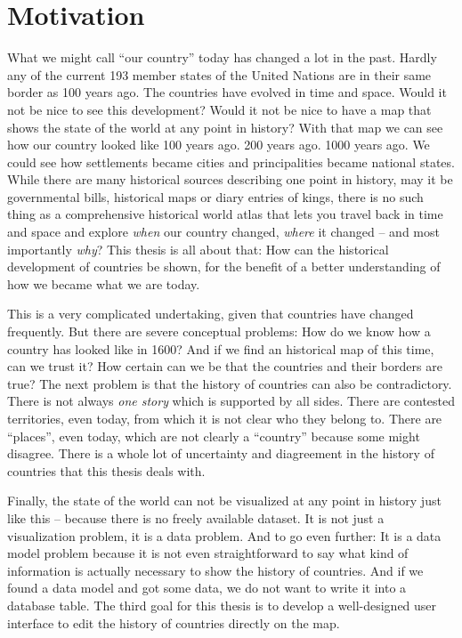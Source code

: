 \section{Motivation} %
\label{sec:motivation}

What we might call ``our country'' today has changed a lot in the past. Hardly any of the current 193 member states of the United Nations are in their same border as 100 years ago. The countries have evolved in time and space. Would it not be nice to see this development? Would it not be nice to have a map that shows the state of the world at any point in history? With that map we can see how our country looked like 100 years ago. 200 years ago. 1000 years ago. We could see how settlements became cities and principalities became national states. While there are many historical sources describing one point in history, may it be governmental bills, historical maps or diary entries of kings, there is no such thing as a comprehensive historical world atlas that lets you travel back in time and space and explore \emph{when} our country changed, \emph{where} it changed -- and most importantly \emph{why}? This thesis is all about that: How can the historical development of countries be shown, for the benefit of a better understanding of how we became what we are today.

This is a very complicated undertaking, given that countries have changed frequently. But there are severe conceptual problems: How do we know how a country has looked like in 1600? And if we find an historical map of this time, can we trust it? How certain can we be that the countries and their borders are true? The next problem is that the history of countries can also be contradictory. There is not always \emph{one story} which is supported by all sides. There are contested territories, even today, from which it is not clear who they belong to. There are ``places'', even today, which are not clearly a ``country'' because some might disagree. There is a whole lot of uncertainty and diagreement in the history of countries that this thesis deals with.

Finally, the state of the world can not be visualized at any point in history just like this -- because there is no freely available dataset. It is not just a visualization problem, it is a data problem. And to go even further: It is a data model problem because it is not even straightforward to say what kind of information is actually necessary to show the history of countries. And if we found a data model and got some data, we do not want to write it into a database table. The third goal for this thesis is to develop a well-designed user interface to edit the history of countries directly on the map.

